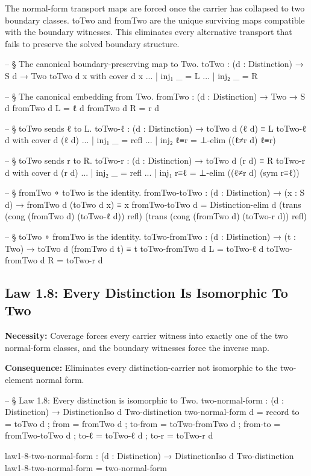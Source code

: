 \documentclass[11pt,a4paper]{book}
\def\texttt#1{#1}%
\begin{document}
The normal-form transport maps are forced once the carrier has collapsed to two boundary classes.
\texttt{toTwo} and \texttt{fromTwo} are the unique surviving maps compatible with the boundary witnesses.
This eliminates every alternative transport that fails to preserve the solved boundary structure.

\begin{code}
-- § The canonical boundary-preserving map to Two.
toTwo : (d : Distinction) → S d → Two
toTwo d x with cover d x
... | inj₁ _ = L
... | inj₂ _ = R

-- § The canonical embedding from Two.
fromTwo : (d : Distinction) → Two → S d
fromTwo d L = ℓ d
fromTwo d R = r d

-- § toTwo sends ℓ to L.
toTwo-ℓ : (d : Distinction) → toTwo d (ℓ d) ≡ L
toTwo-ℓ d with cover d (ℓ d)
... | inj₁ _   = refl
... | inj₂ ℓ≡r = ⊥-elim ((ℓ≠r d) ℓ≡r)

-- § toTwo sends r to R.
toTwo-r : (d : Distinction) → toTwo d (r d) ≡ R
toTwo-r d with cover d (r d)
... | inj₂ _   = refl
... | inj₁ r≡ℓ = ⊥-elim ((ℓ≠r d) (sym r≡ℓ))

-- § fromTwo ∘ toTwo is the identity.
fromTwo-toTwo : (d : Distinction) → (x : S d) → fromTwo d (toTwo d x) ≡ x
fromTwo-toTwo d =
  Distinction-elim d
    (trans (cong (fromTwo d) (toTwo-ℓ d)) refl)
    (trans (cong (fromTwo d) (toTwo-r d)) refl)

-- § toTwo ∘ fromTwo is the identity.
toTwo-fromTwo : (d : Distinction) → (t : Two) → toTwo d (fromTwo d t) ≡ t
toTwo-fromTwo d L = toTwo-ℓ d
toTwo-fromTwo d R = toTwo-r d
\end{code}

\subsection{Law 1.8: Every Distinction Is Isomorphic To Two}

\textbf{Necessity:} Coverage forces every carrier witness into exactly one of the two normal-form classes, and the boundary witnesses force the inverse map.

\textbf{Consequence:} Eliminates every distinction-carrier not isomorphic to the two-element normal form.

\begin{code}
-- § Law 1.8: Every distinction is isomorphic to Two.
two-normal-form : (d : Distinction) → DistinctionIso d Two-distinction
two-normal-form d = record
  { to      = toTwo d
  ; from    = fromTwo d
  ; to-from = toTwo-fromTwo d
  ; from-to = fromTwo-toTwo d
  ; to-ℓ    = toTwo-ℓ d
  ; to-r    = toTwo-r d
  }

law1-8-two-normal-form : (d : Distinction) → DistinctionIso d Two-distinction
law1-8-two-normal-form = two-normal-form
\end{code}
\end{document}
